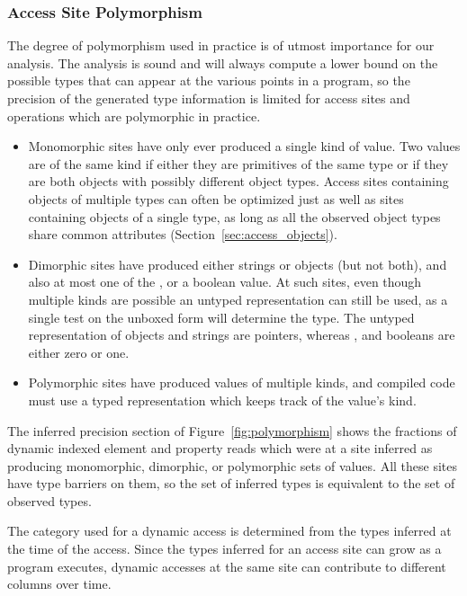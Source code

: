 \subsubsection{Access Site Polymorphism}
\label{sec:access_polymorphism}

The degree of polymorphism used in practice is of utmost importance
for our analysis.
The analysis is sound and will always compute a lower bound on the possible
types that can appear at the various points in a program,
so the precision of the generated type information is limited for
access sites and operations which are polymorphic in practice.

\begin{itemize}

\item Monomorphic sites have only ever produced a single kind of value.
Two values are of the same kind if either they are primitives of the same
type or if they are both objects with possibly different
object types.
Access sites containing objects of multiple types can often be optimized
just as well as sites containing objects of a single type, as long as
all the observed object types share common attributes (Section~\ref{sec:access_objects}).

\item Dimorphic sites have produced either strings or objects (but not both),
and also at most one of the ,  or a boolean value.
At such sites, even though multiple kinds are possible an untyped
representation can still be used,
as a single test on the unboxed form will determine the type.
The untyped representation of objects and strings are pointers,
whereas ,  and booleans are either zero or one.

\item Polymorphic sites have produced values of multiple kinds,
and compiled code must use a typed representation which keeps track of
the value's kind.

\end{itemize}

The inferred precision section of Figure~\ref{fig:polymorphism} shows the fractions
of dynamic indexed element and property reads which were at a site inferred
as producing
monomorphic, dimorphic, or polymorphic sets of values.
All these sites have type barriers on them, so the set of inferred types
is equivalent to the set of observed types.

The category used for a dynamic access is determined from the types
inferred at the time of the access.
Since the types inferred for an access site can grow as a program executes,
dynamic accesses at the same site can contribute to different
columns over time.

